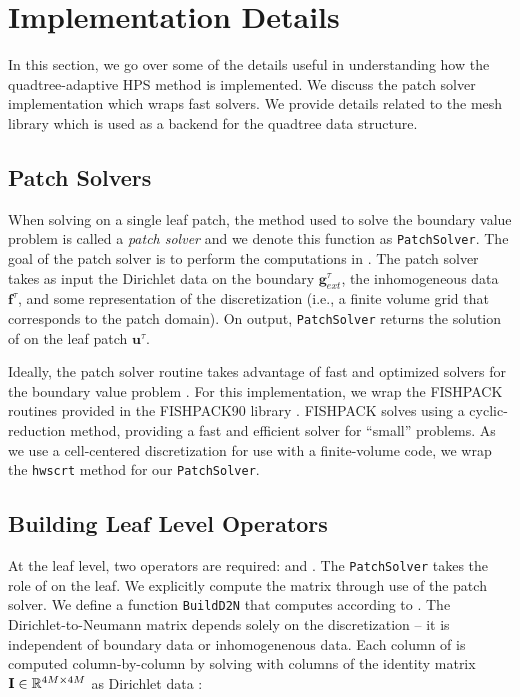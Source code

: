 \section{Implementation Details}
\label{sec:adaptivity}

In this section, we go over some of the details useful in understanding how the quadtree-adaptive HPS method is implemented. We discuss the patch solver implementation which wraps fast solvers. We provide details related to the mesh library \pforest which is used as a backend for the quadtree data structure.

\subsection{Patch Solvers}
\label{sub:patch_solvers}

When solving  on a single leaf patch, the method used to solve the boundary value problem is called a {\em patch solver} and we denote this function as \texttt{PatchSolver}. The goal of the patch solver is to perform the computations in . The patch solver takes as input the Dirichlet data on the boundary $\textbf{g}_{ext}^{\tau}$, the inhomogeneous data $\textbf{f}^{\tau}$, and some representation of the discretization (i.e., a finite volume grid that corresponds to the patch domain). On output, \texttt{PatchSolver} returns the solution of  on the leaf patch $\textbf{u}^{\tau}$.

Ideally, the patch solver routine takes advantage of fast and optimized solvers for the boundary value problem . For this implementation, we wrap the FISHPACK routines \citep{swarztrauber1999fishpack} provided in the FISHPACK90 library \citep{adams2016fishpack90}. FISHPACK solves  using a cyclic-reduction method, providing a fast and efficient solver for ``small'' problems. As we use a cell-centered discretization for use with a finite-volume code, we wrap the \texttt{hwscrt} method for our \texttt{PatchSolver}.

\subsection{Building Leaf Level Operators}

At the leaf level, two operators are required: \Stau and \Ttau. The \texttt{PatchSolver} takes the role of \Stau on the leaf. We explicitly compute the matrix \Ttau through use of the patch solver. We define a function \texttt{BuildD2N} that computes \Ttau according to . The Dirichlet-to-Neumann matrix depends solely on the discretization -- it is independent of boundary data or inhomogenenous data. Each column of \Ttau is computed column-by-column by solving  with columns of the identity matrix $\textbf{I} \in \mathbb R^{4M \times 4M}$ as Dirichlet data \gtau:

